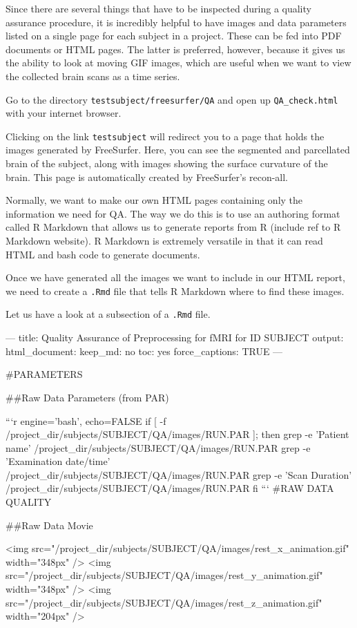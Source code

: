 Since there are several things that have to be inspected during a quality assurance procedure, it is incredibly helpful to have images and data parameters listed on a single page for each subject in a project. These can be fed into PDF documents or HTML pages. The latter is preferred, however, because it gives us the ability to look at moving GIF images, which are useful when we want to view the collected brain scans as a time series. 

Go to the directory \texttt{testsubject/freesurfer/QA} and open up \texttt{QA_check.html} with your internet browser. 

Clicking on the link \texttt{testsubject} will redirect you to a page that holds the images generated by FreeSurfer. Here, you can see the segmented and parcellated brain of the subject, along with images showing the surface curvature of the brain. This page is automatically created by FreeSurfer's recon-all.

Normally, we want to make our own HTML pages containing only the information we need for QA. The way we do this is to use an authoring format called R Markdown that allows us to generate reports from R (include ref to R Markdown website). R Markdown is extremely versatile in that it can read HTML and bash code to generate documents. 

Once we have generated all the images we want to include in our HTML report, we need to create a \texttt{.Rmd} file that tells R Markdown where to find these images. 

Let us have a look at a subsection of a \texttt{.Rmd} file.
\begin{bash}
---
title: Quality Assurance of Preprocessing for fMRI for ID SUBJECT
output:
  html_document:
    keep_md: no
    toc: yes
    force_captions: TRUE
---

#PARAMETERS

##Raw Data Parameters (from PAR)

```{r engine='bash', echo=FALSE}
if [ -f /project_dir/subjects/SUBJECT/QA/images/RUN.PAR ]; then
  grep -e 'Patient name' /project_dir/subjects/SUBJECT/QA/images/RUN.PAR
  grep -e 'Examination date/time' /project_dir/subjects/SUBJECT/QA/images/RUN.PAR
  grep -e 'Scan Duration' /project_dir/subjects/SUBJECT/QA/images/RUN.PAR
fi
```
#RAW DATA QUALITY

##Raw Data Movie

<img src="/project_dir/subjects/SUBJECT/QA/images/rest_x_animation.gif" width="348px" />
<img src="/project_dir/subjects/SUBJECT/QA/images/rest_y_animation.gif" width="348px" />
<img src="/project_dir/subjects/SUBJECT/QA/images/rest_z_animation.gif" width="204px" />
\end{bash}

